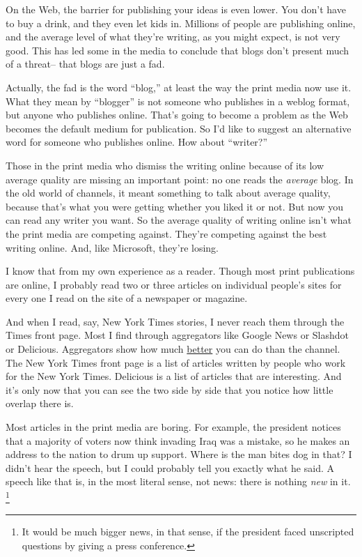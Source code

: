 On the Web, the barrier for publishing your ideas is even lower. You
don't have to buy a drink, and they even let kids in. Millions of people
are publishing online, and the average level of what they're writing, as
you might expect, is not very good. This has led some in the media to
conclude that blogs don't present much of a threat-- that blogs are just
a fad.

Actually, the fad is the word ``blog,'' at least the way the print media
now use it. What they mean by ``blogger'' is not someone who publishes
in a weblog format, but anyone who publishes online. That's going to
become a problem as the Web becomes the default medium for publication.
So I'd like to suggest an alternative word for someone who publishes
online. How about ``writer?''

Those in the print media who dismiss the writing online because of its
low average quality are missing an important point: no one reads the
\emph{average} blog. In the old world of channels, it meant something to
talk about average quality, because that's what you were getting whether
you liked it or not. But now you can read any writer you want. So the
average quality of writing online isn't what the print media are
competing against. They're competing against the best writing online.
And, like Microsoft, they're losing.

I know that from my own experience as a reader. Though most print
publications are online, I probably read two or three articles on
individual people's sites for every one I read on the site of a
newspaper or magazine.

And when I read, say, New York Times stories, I never reach them through
the Times front page. Most I find through aggregators like Google News
or Slashdot or Delicious. Aggregators show how much
\href{http://reddit.com}{better} you can do than the channel. The New
York Times front page is a list of articles written by people who work
for the New York Times. Delicious is a list of articles that are
interesting. And it's only now that you can see the two side by side
that you notice how little overlap there is.

Most articles in the print media are boring. For example, the president
notices that a majority of voters now think invading Iraq was a mistake,
so he makes an address to the nation to drum up support. Where is the
man bites dog in that? I didn't hear the speech, but I could probably
tell you exactly what he said. A speech like that is, in the most
literal sense, not news: there is nothing \emph{new} in it.
\footnote{It would be much bigger news, in that sense, if the president
faced unscripted questions by giving a press conference.}

